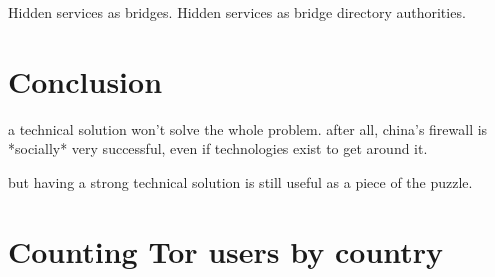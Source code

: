 \documentclass{llncs}
\begin{document}
Hidden services as bridges. Hidden services as bridge directory authorities.

\section{Conclusion}

a technical solution won't solve the whole problem. after all, china's
firewall is *socially* very successful, even if technologies exist to
get around it.

but having a strong technical solution is still useful as a piece of the
puzzle.

 

\appendix

\section{Counting Tor users by country}
\label{app:geoip}
\end{document}
